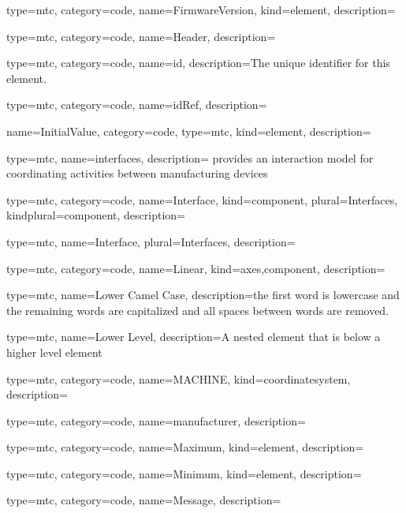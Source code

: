 {
  type=mtc,
  category=code,
  name={FirmwareVersion},
  kind={element},
  description={}
}


{
  type=mtc,
  category=code,
  name={Header},
  description={}
}


{
  type=mtc,
  category=code,
  name={id},
  description={The unique identifier for this element.}
}


{
  type=mtc,
  category=code,
  name={idRef},
  description={}
}


{
  name={InitialValue},
  category=code,
  type=mtc,
  kind={element},
  description={}
}


{
  type=mtc,
  name=interfaces,
  description={ provides an interaction model for coordinating activities between manufacturing devices}
}


{
  type=mtc,
  category=code,
  name={Interface},
  kind={component},
  plural={Interfaces},
  kindplural={component},
  description={}
}


{
  type=mtc,
  name={Interface},
  plural={Interfaces},
  description={}
}


{
  type=mtc,
  category=code,
  name={Linear},
  kind={axes,component},
  description={}
}


{
  type=mtc,
  name={Lower Camel Case},
  description={the first word is lowercase and the remaining words are capitalized and all spaces between words are removed.}
}


{
  type=mtc,
  name={Lower Level},
  description={A nested element that is below a higher level element}
}


{
  type=mtc,
  category=code,
  name={MACHINE},
  kind={coordinatesystem},
  description={}
}


{
  type=mtc,
  category=code,
  name={manufacturer},
  description={}
}


{
  type=mtc,
  category=code,
  name={Maximum},
  kind={element},
  description={}
}


{
  type=mtc,
  category=code,
  name={Minimum},
  kind={element},
  description={}
}


{
  type=mtc,
  category=code,
  name={Message},
  description={}
}


